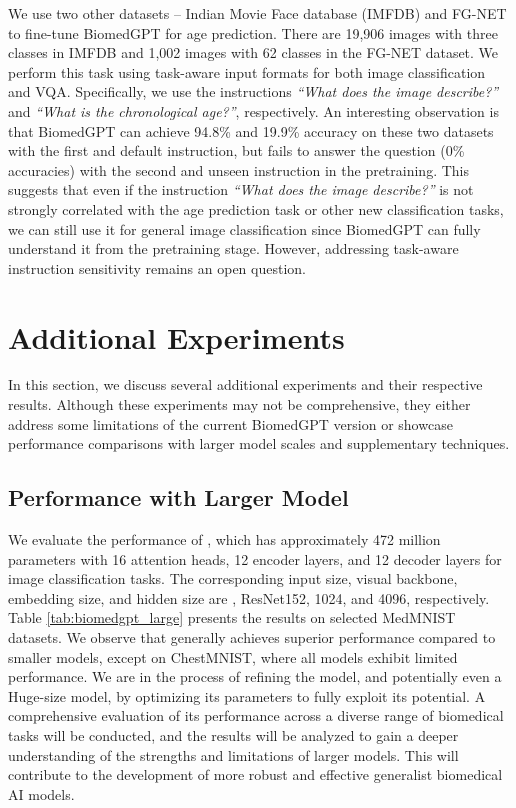 \documentclass[10pt]{article} \usepackage[preprint]{tmlr}
\begin{document}
We use two other datasets -- Indian Movie Face database (IMFDB) \citep{imfdb} and FG-NET \citep{lanitis2002toward} to fine-tune BiomedGPT for age prediction. There are 19,906 images with three classes in IMFDB and 1,002 images with 62 classes in the FG-NET dataset. We perform this task using task-aware input formats for both image classification and VQA. Specifically, we use the instructions \textit{``What does the image describe?''} and \textit{``What is the chronological age?''}, respectively. An interesting observation is that BiomedGPT can achieve 94.8\% and 19.9\% accuracy on these two datasets with the first and default instruction, but fails to answer the question (0\% accuracies) with the second and unseen instruction in the pretraining. This suggests that even if the instruction \textit{``What does the image describe?''} is not strongly correlated with the age prediction task or other new classification tasks, we can still use it for general image classification since BiomedGPT can fully understand it from the pretraining stage. However, addressing task-aware instruction sensitivity remains an open question.


\section{Additional Experiments}
In this section, we discuss several additional experiments and their respective results. Although these experiments may not be comprehensive, they either address some limitations of the current BiomedGPT version or showcase performance comparisons with larger model scales and supplementary techniques.

\subsection{Performance with Larger Model}
We evaluate the performance of , which has approximately 472 million parameters with 16 attention heads, 12 encoder layers, and 12 decoder layers for image classification tasks. The corresponding input size, visual backbone, embedding size, and hidden size are , ResNet152, 1024, and 4096, respectively. Table \ref{tab:biomedgpt_large} presents the results on selected MedMNIST datasets. We observe that  generally achieves superior performance compared to smaller models, except on ChestMNIST, where all models exhibit limited performance. We are in the process of refining the  model, and potentially even a Huge-size model, by optimizing its parameters to fully exploit its potential. A comprehensive evaluation of its performance across a diverse range of biomedical tasks will be conducted, and the results will be analyzed to gain a deeper understanding of the strengths and limitations of larger models. This will contribute to the development of more robust and effective generalist biomedical AI models.
\end{document}
